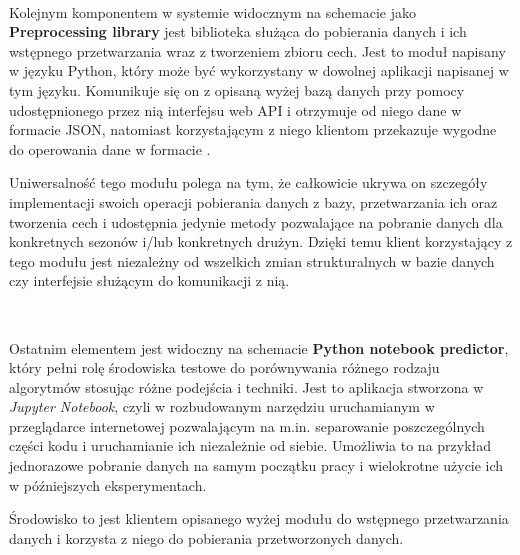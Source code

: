 ~

Kolejnym komponentem w systemie widocznym na schemacie jako \textbf{Preprocessing library} jest biblioteka służąca do pobierania danych i ich wstępnego przetwarzania wraz z tworzeniem zbioru cech. Jest to moduł napisany w języku Python, który może być wykorzystany w dowolnej aplikacji napisanej w tym języku. Komunikuje się on z opisaną wyżej bazą danych przy pomocy udostępnionego przez nią interfejsu web API i otrzymuje od niego dane w formacie JSON, natomiast korzystającym z niego klientom przekazuje wygodne do operowania dane w formacie . 

Uniwersalność tego modułu polega na tym, że całkowicie ukrywa on szczegóły implementacji swoich operacji pobierania danych z bazy, przetwarzania ich oraz tworzenia cech i udostępnia jedynie metody pozwalające na pobranie danych dla konkretnych sezonów i/lub konkretnych drużyn. Dzięki temu klient korzystający z tego modułu jest niezależny od wszelkich zmian strukturalnych w bazie danych czy interfejsie służącym do komunikacji z nią.

~

Ostatnim elementem jest widoczny na schemacie \textbf{Python notebook predictor}, który pełni rolę środowiska testowe do porównywania różnego rodzaju algorytmów stosując różne podejścia i techniki. Jest to aplikacja stworzona w \textit{Jupyter Notebook}, czyli w rozbudowanym narzędziu uruchamianym w przeglądarce internetowej pozwalającym na m.in. separowanie poszczególnych części kodu i uruchamianie ich niezależnie od siebie. Umożliwia to na przykład jednorazowe pobranie danych na samym początku pracy i wielokrotne użycie ich w późniejszych eksperymentach.

Środowisko to jest klientem opisanego wyżej modułu do wstępnego przetwarzania danych i korzysta z niego do pobierania przetworzonych danych. 

\newpage
